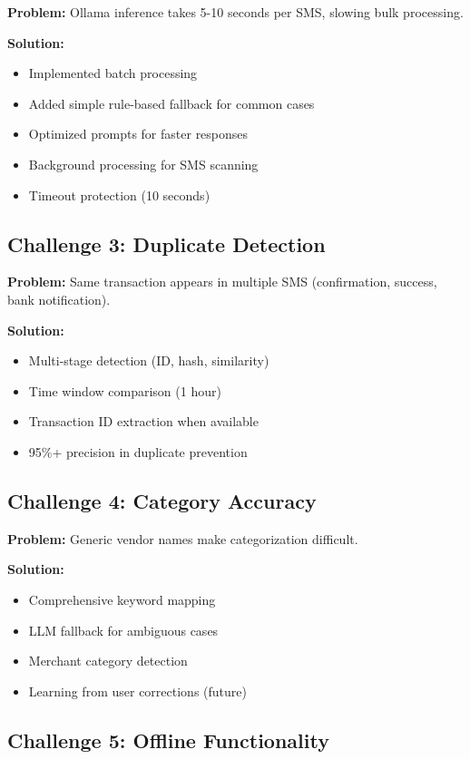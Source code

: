 \documentclass[11pt,a4paper]{report}
\begin{document}
\begin{itemize}
\begin{itemize}
\textbf{Problem:} Ollama inference takes 5-10 seconds per SMS, slowing bulk processing.

\textbf{Solution:}
\begin{itemize}
    \item Implemented batch processing
    \item Added simple rule-based fallback for common cases
    \item Optimized prompts for faster responses
    \item Background processing for SMS scanning
    \item Timeout protection (10 seconds)
\end{itemize}

\subsection{Challenge 3: Duplicate Detection}

\textbf{Problem:} Same transaction appears in multiple SMS (confirmation, success, bank notification).

\textbf{Solution:}
\begin{itemize}
    \item Multi-stage detection (ID, hash, similarity)
    \item Time window comparison (1 hour)
    \item Transaction ID extraction when available
    \item 95\%+ precision in duplicate prevention
\end{itemize}

\subsection{Challenge 4: Category Accuracy}

\textbf{Problem:} Generic vendor names make categorization difficult.

\textbf{Solution:}
\begin{itemize}
    \item Comprehensive keyword mapping
    \item LLM fallback for ambiguous cases
    \item Merchant category detection
    \item Learning from user corrections (future)
\end{itemize}

\subsection{Challenge 5: Offline Functionality}


\end{itemize}
\end{itemize}
\end{document}
